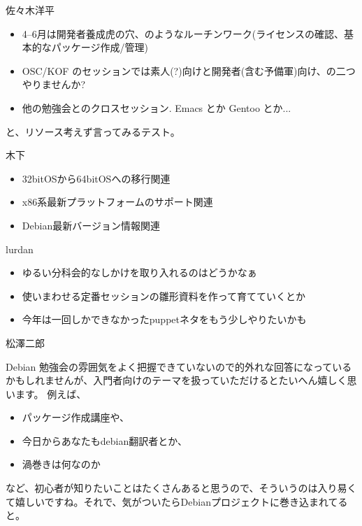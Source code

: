 \documentclass[mingoth,a4paper]{jsarticle}
\begin{document}
\begin{prework}{ 佐々木洋平 }

 \begin{itemize}
  \item 4--6月は開発者養成虎の穴、のようなルーチンワーク(ライセンスの確認、基本的なパッケージ作成/管理)
  \item OSC/KOF のセッションでは素人(?)向けと開発者(含む予備軍)向け、の二つやりませんか?
  \item 他の勉強会とのクロスセッション. Emacs とか Gentoo とか...
 \end{itemize}
と、リソース考えず言ってみるテスト。

\end{prework}

\begin{prework}{ 木下 }

 \begin{itemize}
  \item 32bitOSから64bitOSへの移行関連
  \item x86系最新プラットフォームのサポート関連
  \item Debian最新バージョン情報関連
 \end{itemize}

\end{prework}

\begin{prework}{ lurdan }

 \begin{itemize}
  \item ゆるい分科会的なしかけを取り入れるのはどうかなぁ
  \item 使いまわせる定番セッションの雛形資料を作って育てていくとか
  \item 今年は一回しかできなかったpuppetネタをもう少しやりたいかも
 \end{itemize}

\end{prework}

\begin{prework}{ 松澤二郎 }

Debian 勉強会の雰囲気をよく把握できていないので的外れな回答になっているかもしれませんが、入門者向けのテーマを扱っていただけるとたいへん嬉しく思います。
例えば、

\begin{itemize}
\item パッケージ作成講座や、
\item 今日からあなたもdebian翻訳者とか、
\item 渦巻きは何なのか
\end{itemize}
など、初心者が知りたいことはたくさんあると思うので、そういうのは入り易くて嬉しいですね。それで、気がついたらDebianプロジェクトに巻き込まれてると。

\end{prework}
\end{document}
